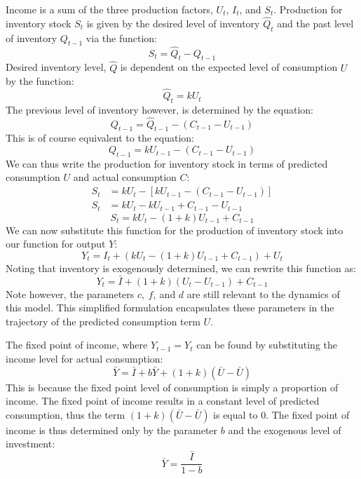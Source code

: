 Income is a sum of the three production factors, $U_t$, $I_t$, and $S_t$. Production for inventory stock $S_t$ is given by the desired level of inventory $\hat Q_t$ and the past level of inventory $Q_{t-1}$ via the function:
\begin{equation}
S_t=\hat Q_t-Q_{t-1}    
\end{equation}
Desired inventory level, $\hat Q$ is dependent on the expected level of consumption $U$ by the function:
\begin{equation}
    \hat Q_t = kU_t
\end{equation}
The previous level of inventory however, is determined by the equation:
\begin{equation*}
    Q_{t-1}=\hat Q_{t-1}-(C_{t-1}-U_{t-1})
\end{equation*}
This is of course equivalent to the equation:
\begin{equation}
    Q_{t-1}=kU_{t-1}-(C_{t-1}-U_{t-1})
\end{equation}
We can thus write the production for inventory stock in terms of predicted consumption $U$ and actual consumption $C$:
\begin{align*}
    S_t&=kU_t-[kU_{t-1}-(C_{t-1}-U_{t-1})]\\
    S_t&=kU_t-kU_{t-1}+C_{t-1}-U_{t-1}
\end{align*}
\begin{equation}
    S_t=kU_t-(1+k)U_{t-1}+C_{t-1}
\end{equation}
We can now substitute this function for the production of inventory stock into our function for output $Y$:
\begin{equation*}
    Y_t=  I_t + (kU_t-(1+k)U_{t-1}+C_{t-1}) + U_t
\end{equation*}
Noting that inventory is exogenously determined, we can rewrite this function as:
\begin{equation}
    Y_t = \bar I +(1+k)(U_t-U_{t-1}) + C_{t-1}
\end{equation}
Note however, the parameters $c,\ f,\ $and $d$ are still relevant to the dynamics of this model. This simplified formulation encapsulates these parameters in the trajectory of the predicted consumption term $U$.

The fixed point of income, where $Y_{t-1}=Y_t$ can be found by substituting the income level for actual consumption:
\begin{equation*}
    \bar Y = \bar I + b \bar Y + (1+k)(\bar U-\bar U)
\end{equation*}
This is because the fixed point level of consumption is simply a proportion of income. The fixed point of income results in a constant level of predicted consumption, thus the term $(1+k)(\bar U-\bar U)$ is equal to 0. The fixed point of income is thus determined only by the parameter $b$ and the exogenous level of investment:
\begin{equation}
    \bar Y= \frac{\bar I}{1-b}
\end{equation}

